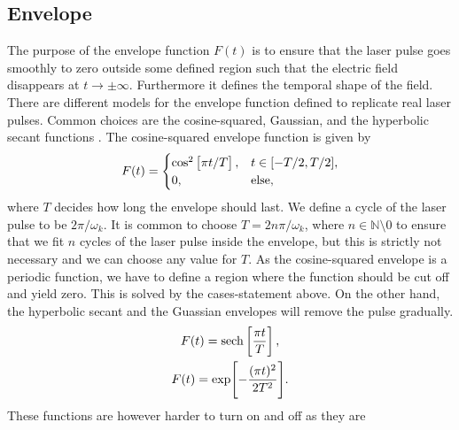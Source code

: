         \subsection{Envelope}
            \label{subsec:envelope}
            The purpose of the envelope function $F(t)$ is to ensure that the
            laser pulse goes smoothly to zero outside some defined region such
            that the electric field disappears at $t \to \pm \infty$.
            Furthermore it defines the temporal shape of the field.
            There are different models for the envelope function defined to
            replicate real laser pulses.
            Common choices are the cosine-squared, Gaussian, and the hyperbolic
            secant functions \cite{joachain2012atoms}.
            The cosine-squared envelope function is given by
            \begin{gather}
                F(t) = \begin{cases}
                    \cos^2\left[ 
                        \pi t / T
                     \right], & t \in [-T / 2, T / 2], \\
                    0, & \text{else},
                \end{cases}
            \end{gather}
            where $T$ decides how long the envelope should last.
            We define a cycle of the laser pulse to be $2\pi/\omega_k$.
            It is common to choose $T = 2n\pi/\omega_k$, where $n \in
            \mathbb{N}\setminus{0}$ to ensure that we fit $n$ cycles of the
            laser pulse inside the envelope, but this is strictly not necessary
            and we can choose any value for $T$.
            As the cosine-squared envelope is a periodic function, we have to
            define a region where the function should be cut off and yield zero.
            This is solved by the cases-statement above.
            On the other hand, the hyperbolic secant and the Guassian envelopes
            will remove the pulse gradually.
            \begin{gather}
                F(t) = \sech\brak{
                    \frac{\pi t}{T}
                }, \\
                F(t) = \exp[
                    -\frac{(\pi t)^2}{2T^2}
                ].
            \end{gather}
            These functions are however harder to turn on and off as they are
